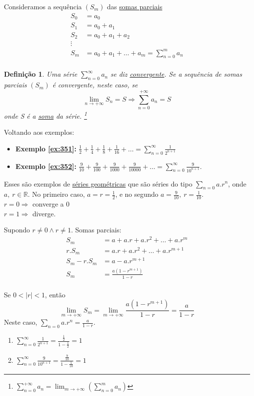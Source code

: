 \documentclass[12pt,openany]{book}
\newtheorem{definition}{Definição}[section]
\begin{document}
Consideramos a sequência $(S_m)$ das \underline{somas parciais}
\begin{align*}
S_0 &= a_0 \\
S_1 &= a_0 + a_1 \\
S_2 &= a_0 + a_1 + a_2 \\
\vdots \\
S_m &= a_0 + a_1 + \hdots + a_m = \sum_{n=0}^m a_n \\
\end{align*}


\begin{definition}
Uma série $\sum_{n=0}^{\infty} a_n$ se diz \underline{convergente}. Se a sequência de somas parciais $(S_m)$ é convergente, neste caso, se $$ \lim_{n \rightarrow +\infty} S_n = S \Rightarrow \sum_{n=0}^{+\infty} a_n = S $$ onde S é a \underline{soma} da série. \footnote{$\displaystyle{\sum_{n=0}^{+\infty} a_n = \lim_{m \rightarrow +\infty} \left(\sum_{n=0}^m a_n\right)}$ }
\end{definition}

Voltando aos exemplos:
\begin{itemize}
\item \textbf{Exemplo \ref{ex:351}: } $\displaystyle{\frac{1}{2} + \frac{1}{4} + \frac{1}{8} + \frac{1}{16} + \hdots = \sum_{n=0}^{\infty} \frac{1}{2^{n+1}}}$
\item \textbf{Exemplo \ref{ex:352}: } $\displaystyle{\frac{9}{10} + \frac{9}{100} + \frac{9}{1000} + \frac{9}{10000} + \hdots = \sum_{n=0}^{\infty} \frac{9}{10^{n+1}}}$.
\end{itemize}
Esses são exemplos de \underline{séries geométricas} que são séries do tipo $\displaystyle{\sum_{n=0} a.r^n}$, onde $a, \ r \in \mathds{R}$. No primeiro caso, $a=r=\frac{1}{2}$, e no segundo $a = \frac{9}{10}, \ r = \frac{1}{10}$. \\ $r = 0 \Rightarrow $ converge a 0 \\ $r = 1 \Rightarrow $ diverge.

Supondo $r \neq 0 \land r \neq 1$. Somas parciais:
\begin{align*}
S_m &= a + a.r + a.r^2 + \hdots + a.r^m \\
r.S_m &= a.r + a.r^2 + \hdots + a.r^{m+1} \\
S_m - r.S_m &= a - a.r^{m+1} \\
S_m &= \frac{a(1-r^{m+1})}{1-r} \\
\end{align*}

Se $0 < |r| < 1$, então $$\lim_{m \rightarrow +\infty} S_m = \lim_{m \rightarrow +\infty} \frac{a(1-r^{m+1})}{1-r} = \frac{a}{1-r}$$ Neste caso, $\displaystyle{\sum_{n=0} a.r^n = \frac{a}{1-r}}$.
\begin{enumerate}
\item $\sum_{n=0}^{\infty} \frac{1}{2^{n+1}} = \frac{\frac{1}{2}}{1-\frac{1}{2}} = 1$
\item $\sum_{n=0}^{\infty} \frac{9}{10^{n+1}} = \frac{\frac{9}{10}}{1-\frac{1}{10}} = 1 $
\end{enumerate}
\end{document}
